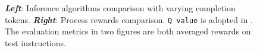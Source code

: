 \begin{figure}[!htpb]
    \centering
    \begin{subfigure}[Inference performance.]{
    \label{fig:infer_curve}
        \centering
        \texttt{[image: figs/raw/infer\_curve\_v7.pdf]}}
    \end{subfigure}
    \hfill
    \begin{subfigure}[Self-training baselines.]{
    \label{fig:self_train+prm}
        \centering
        \texttt{[image: figs/raw/self\_train\_comparison.pdf]}}
    \end{subfigure}
    \vspace{-7pt}
    \caption{ \textit{\textbf{Left}}: Inference algorithms comparison with varying completion tokens. \textit{\textbf{Right}}: Process rewards comparison. \texttt{Q value} is adopted in {\ours}. The evaluation metrics in two figures are both averaged rewards on test instructions.}
    \label{fig:infer_and_another}
\end{figure}
